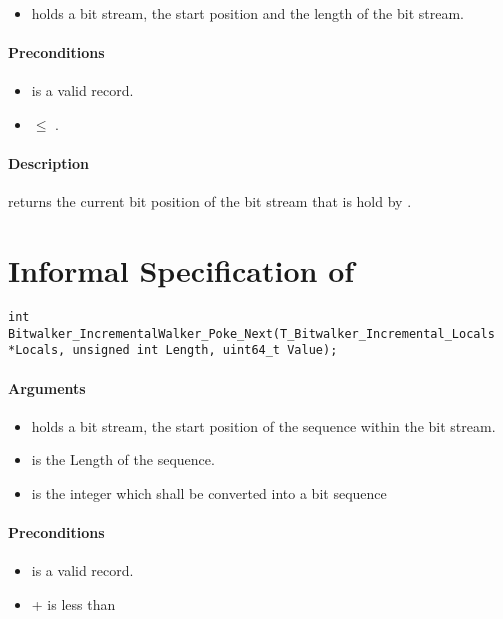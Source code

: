 \begin{itemize}
    \item  {} holds a bit stream, the start position and the length of the bit stream.
\end{itemize}

\paragraph{Preconditions}
\begin{itemize}
    \item  {} is a valid record.
    \item {} $\leq $ .
\end{itemize}

\paragraph{Description}

\peekfinish  returns the current bit position of the bit stream that is hold by .


\clearpage

\section{Informal Specification of }
\begin{lstlisting}[style=acsl-block]
int		 Bitwalker_IncrementalWalker_Poke_Next(T_Bitwalker_Incremental_Locals *Locals, unsigned int Length, uint64_t Value);
\end{lstlisting}

\paragraph{Arguments}

\begin{itemize}
    \item  {} holds a bit stream, the start position of the sequence within the bit stream.
   \item {} is the Length of the sequence.
   \item {} is the integer which shall be converted into a bit sequence
\end{itemize}

\paragraph{Preconditions}
\begin{itemize}
    \item  {} is a valid record.
    \item {} +  is less than 
\end{itemize}

